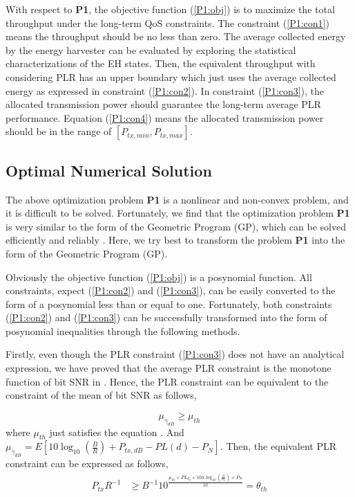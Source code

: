 \documentclass[journal,10pt]{IEEEtran}
\begin{document}
With respect to \textbf{P1}, the objective function (\ref{P1:obj}) is to maximize the total throughput under the long-term QoS constraints. The constraint (\ref{P1:con1}) means the throughput should be no less than zero. The average collected energy by the energy harvester can be evaluated by exploring the statistical characterizations of the EH states. Then, the equivalent throughput with considering PLR has an upper boundary which just uses the average collected energy as expressed in constraint (\ref{P1:con2}). In constraint (\ref{P1:con3}), the allocated transmission power should guarantee the long-term average PLR performance. Equation (\ref{P1:con4}) means the allocated transmission power should be in the range of $[P_{tx,min},P_{tx,max}]$.

\subsection{Optimal Numerical Solution}

The above optimization problem \textbf{P1} is a nonlinear and non-convex problem, and it is difficult to be solved. Fortunately, we find that the optimization problem \textbf{P1} is very similar to the form of the Geometric Program (GP), which can be solved efficiently and reliably \cite{boyd2004convex}. Here, we try best to transform the problem \textbf{P1} into the form of the Geometric Program (GP).

Obviously the objective function (\ref{P1:obj}) is a posynomial function. All constraints, expect (\ref{P1:con2}) and (\ref{P1:con3}), can be easily converted to the form of a posynomial less than or equal to one. Fortunately, both constraints (\ref{P1:con2}) and (\ref{P1:con3}) can be successfully transformed into the form of posynomial inequalities through the following methods.

Firstly, even though the PLR constraint (\ref{P1:con3}) does not have an analytical expression, we have proved that the average PLR constraint is the monotone function of bit SNR in \cite{liu2017transmission}. Hence, the PLR constraint can be equivalent to the constraint of the mean of bit SNR as follows, 

\begin{equation}
{\mu _{{\gamma _{dB}}}} \ge \mu_{th}
\end{equation}
where $\mu_{th}$ just satisfies the equation . And ${\mu _{{\gamma _{dB}}}}= E\left[ {10{{\log }_{10}}\left( {\frac{B}{R}} \right) + {P_{tx,dB}} - {PL\left( d \right)}- {P_{N}}} \right]$. Then, the equivalent PLR constraint can be expressed as follows,
\begin{equation} 
\begin{split}
P_{tx}{R^{{ - 1}}} & \ge {B^{ - 1}} {10^{\frac{{\mu _{th}+ {PL_{d_0}} + 10n{\log _{10}}\left( {\frac{d}{{{d_0}}}} \right)  + {P_{N}}}}{{10}}}} = {\theta _{th}}
\end{split}
\end{equation} 
\end{document}
